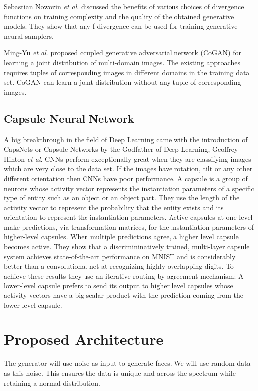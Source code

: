 \documentclass{vldb}
\begin{document}
Sebastian Nowozin \textit{et al}. \cite{vardivmin} discussed the benefits of various choices of divergence functions on training complexity and the quality of the obtained generative models. They show that any f-divergence can be used for training generative neural samplers. 
\par\bigskip

Ming-Yu \textit{et al}. \cite{copgan} proposed coupled generative adversarial network (CoGAN) for learning a joint distribution of multi-domain images. The existing approaches requires tuples of corresponding images in different domains in the training data set. CoGAN can learn a joint distribution without any tuple of corresponding images.
\par\bigskip

\subsection{Capsule Neural Network} %
\label{sec:capsule_neural_network}
A big breakthrough in the field of Deep Learning came with the introduction of CapsNets or Capsule Networks \cite{capsnet} by the Godfather of Deep Learning, Geoffrey Hinton \textit{et al}. CNNs perform exceptionally great when they are classifying images which are very close to the data set. If the images have rotation, tilt or any other different orientation then CNNs have poor performance. A capsule is a group of neurons whose activity vector represents the instantiation parameters of a specific type of entity such as an object or an object part. They use the length of the activity vector to represent the probability that the entity exists and its orientation to represent the instantiation parameters. Active capsules at one level make predictions, via transformation matrices, for the instantiation parameters of higher-level capsules. When multiple predictions agree, a higher level capsule becomes active. They show that a discrimininatively trained, multi-layer capsule system achieves state-of-the-art performance on MNIST and is considerably better than a convolutional net at recognizing highly overlapping digits. To achieve these results they use an iterative routing-by-agreement mechanism: A lower-level capsule prefers to send its output to higher level capsules whose activity vectors have a big scalar product with the prediction coming from the lower-level capsule.

\section{Proposed Architecture}
The generator will use noise as input to generate faces. We will use random data as this noise. This ensures the data is unique and across the spectrum while retaining a normal distribution.
\par\bigskip
\end{document}
